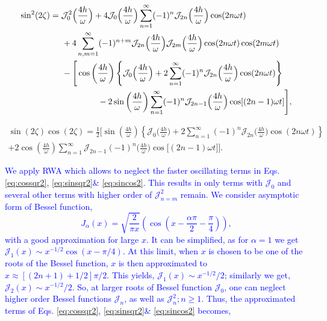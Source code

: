 \documentclass[12pt]{iopart}
\newcommand{\blue}[1]{\textcolor{blue}{#1}}
\begin{document}
\begin{align}
\sin^2(2\zeta)
&= \mathcal{J}^2_0\Big(\frac{4h}{\omega}\Big) + 4\mathcal{J}_0\Big(\frac{4h}{\omega}\Big)\sum_{n=1}^\infty (-1)^n \mathcal{J}_{2n}\Big(\frac{4h}{\omega}\Big)\cos(2n\omega t)\nonumber\\
&\hspace{0.5cm}+4\sum_{n,m=1}^\infty(-1)^{n+m}\mathcal{J}_{2n}\Big(\frac{4h}{\omega}\Big)\mathcal{J}_{2m}\Big(\frac{4h}{\omega}\Big) \cos(2n\omega t)\cos(2m\omega t)\nonumber\\
&\hspace{0.5cm}-\Bigg[\cos\left(\frac{4h}{\omega}\right)\left\{\mathcal{J}_0\Big(\frac{4h}{\omega}\Big) + 2 \sum_{n=1}^\infty (-1)^n \mathcal{J}_{2n}\Big(\frac{4h}{\omega}\Big)\cos(2n\omega t)\right\}\nonumber\\
&\hspace{2.0cm}-2\sin\left(\frac{4h}{\omega}\right) \sum_{n=1}^\infty(-1)^n \mathcal{J}_{2n-1}\Big(\frac{4h}{\omega}\Big)\cos[(2n-1)\omega t]\Bigg],
\label{eq:sinsqr2}
\end{align}

\begin{multline}
\sin(2\zeta) \cos(2\zeta) = \frac12 \Bigg[\sin\left(\frac{4h}{\omega}\right)\left\{\mathcal{J}_0\Big(\frac{4h}{\omega}\Big) + 2 \sum_{n=1}^\infty (-1)^n \mathcal{J}_{2n}\Big(\frac{4h}{\omega}\Big)\cos(2n\omega t)\right\}\\+2\cos\left(\frac{4h}{\omega}\right)\sum_{n=1}^\infty \mathcal{J}_{2n-1}(-1)^n\Big(\frac{4h}{\omega}\Big)\cos\big[(2n-1)\omega t]\Bigg].
\label{eq:sincos2}
\end{multline}

\blue{
We apply RWA which allows to neglect the faster oscillating terms in Eqs. \eqref{eq:cossqr2}, \eqref{eq:sinsqr2}\& \eqref{eq:sincos2}. This results in only terms with $\mathcal{J}_0$ and several other terms with higher order of $\mathcal{J}^2_{n=m}$ remain. We consider asymptotic form of Bessel function,
\begin{equation*}
	J_\alpha(x)=\sqrt{\frac{2}{\pi x}}\left(\cos \left(x-\frac{\alpha \pi}{2}-\frac{\pi}{4}\right)\right),
\end{equation*}
with a good approximation for large $x$. It can be simplified, as for  $\alpha=1$ we get $\mathcal{J}_1(x) \sim x^{-1 / 2} \cos (x-\pi / 4)$. At this limit, when $x$ is chosen to be one of the roots of the Bessel function, $x$ is then approximated to $x\approx [(2n+1)+1/2]\pi/2$. This yields, $\mathcal{J}_1(x)\sim x^{-1/2}/2$; similarly we get, $\mathcal{J}_2(x)\sim x^{-1/2}/2$. So, at larger roots of Bessel function $\mathcal{J}_0$, one can neglect higher order Bessel functions $\mathcal{J}_n$, as well as $\mathcal{J}^2_n; n\ge 1$.  Thus, the approximated terms of Eqs. \eqref{eq:cossqr2}, \eqref{eq:sinsqr2}\& \eqref{eq:sincos2} becomes,}
\end{document}
